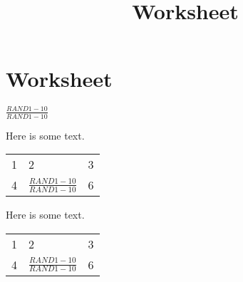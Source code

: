 \documentclass{article}
\title{Worksheet}
\begin{document}
\section{Worksheet}



$ \frac{RAND1-10}{RAND1-10} $

Here is some text.

\begin{tabular}{l l l}
	1 & 2 & 3\\
	4 & $ \frac{RAND1-10}{RAND1-10} $ & 6
\end{tabular}

Here is some text.

\begin{tabularx}{\textwidth}{X X X}
	1 & 2 & 3\\
	4 & $ \frac{RAND1-10}{RAND1-10} $ & 6
\end{tabularx}
\end{document}
